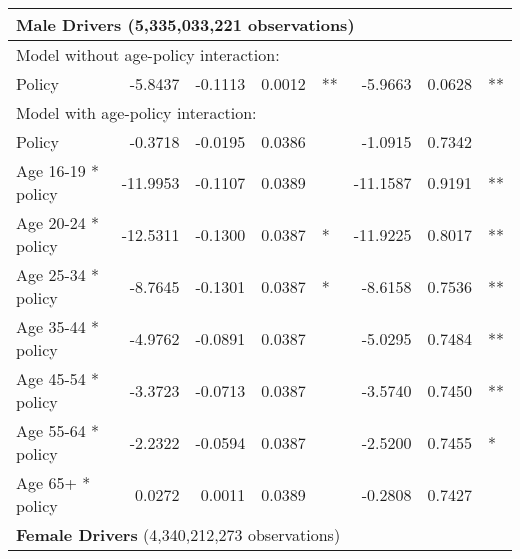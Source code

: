 \begin{table}
\begin{tabular}{l r r r l r r l}
\hline 

\multicolumn{7}{l}{\textbf{Male Drivers} (5,335,033,221 observations)} \\ 

\hline
\multicolumn{7}{l}{Model without age-policy interaction: } \\ 
Policy                   &  -5.8437       &  -0.1113        &  0.0012       &   **       &  -5.9663        &  0.0628       &   **       \\ 
\hline
\multicolumn{7}{l}{Model with age-policy interaction: } \\ 
Policy                   &  -0.3718       &  -0.0195        &  0.0386       &            &  -1.0915        &  0.7342       &            \\ 
Age 16-19 * policy   &  -11.9953       &  -0.1107        &  0.0389       &            &  -11.1587        &  0.9191       &   **       \\ 
Age 20-24 * policy   &  -12.5311       &  -0.1300        &  0.0387       &    *       &  -11.9225        &  0.8017       &   **       \\ 
Age 25-34 * policy   &  -8.7645       &  -0.1301        &  0.0387       &    *       &  -8.6158        &  0.7536       &   **       \\ 
Age 35-44 * policy   &  -4.9762       &  -0.0891        &  0.0387       &            &  -5.0295        &  0.7484       &   **       \\ 
Age 45-54 * policy   &  -3.3723       &  -0.0713        &  0.0387       &            &  -3.5740        &  0.7450       &   **       \\ 
Age 55-64 * policy   &  -2.2322       &  -0.0594        &  0.0387       &            &  -2.5200        &  0.7455       &    *       \\ 
Age 65+ * policy   &  0.0272       &  0.0011        &  0.0389       &            &  -0.2808        &  0.7427       &            \\ 

\hline 

\multicolumn{7}{l}{\textbf{Female Drivers} (4,340,212,273 observations)} \\ 


\end{tabular}
\end{table}
